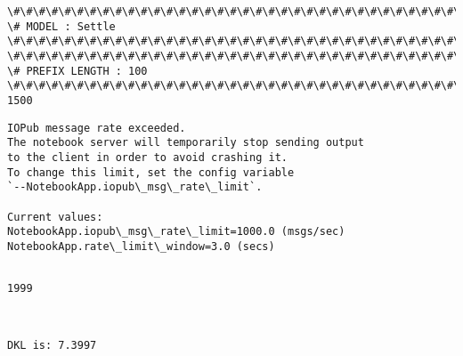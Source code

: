 \documentclass[11pt]{article}
\begin{document}
    \begin{Verbatim}[commandchars=\\\{\}]
\#\#\#\#\#\#\#\#\#\#\#\#\#\#\#\#\#\#\#\#\#\#\#\#\#\#\#\#\#\#\#\#\#\#\#\#\#\#\#\#\#\#\#\#\#\#\#\#\#\#\#\#\#\#\#\#\#\#\#\#\#\#\#\#\#\#\#\#\#\#\#\#\#\#\#\#
\# MODEL : Settle
\#\#\#\#\#\#\#\#\#\#\#\#\#\#\#\#\#\#\#\#\#\#\#\#\#\#\#\#\#\#\#\#\#\#\#\#\#\#\#\#\#\#\#\#\#\#\#\#\#\#\#\#\#\#\#\#\#\#\#\#\#\#\#\#\#\#\#\#\#\#\#\#\#\#\#\#
\#\#\#\#\#\#\#\#\#\#\#\#\#\#\#\#\#\#\#\#\#\#\#\#\#\#\#\#\#\#\#\#\#\#\#\#\#\#\#\#\#\#\#\#\#\#\#\#\#\#\#\#\#\#\#\#\#\#\#\#\#\#\#\#\#\#\#\#\#\#\#\#\#\#\#\#
\# PREFIX LENGTH : 100
\#\#\#\#\#\#\#\#\#\#\#\#\#\#\#\#\#\#\#\#\#\#\#\#\#\#\#\#\#\#\#\#\#\#\#\#\#\#\#\#\#\#\#\#\#\#\#\#\#\#\#\#\#\#\#\#\#\#\#\#\#\#\#\#\#\#\#\#\#\#\#\#\#\#\#\#
1500

    \end{Verbatim}

    \begin{Verbatim}[commandchars=\\\{\}]
IOPub message rate exceeded.
The notebook server will temporarily stop sending output
to the client in order to avoid crashing it.
To change this limit, set the config variable
`--NotebookApp.iopub\_msg\_rate\_limit`.

Current values:
NotebookApp.iopub\_msg\_rate\_limit=1000.0 (msgs/sec)
NotebookApp.rate\_limit\_window=3.0 (secs)


    \end{Verbatim}

    \begin{Verbatim}[commandchars=\\\{\}]
1999

    \end{Verbatim}

    \begin{center}
    \end{center}
    { \hspace*{\fill} \\}
    
    \begin{Verbatim}[commandchars=\\\{\}]
DKL is: 7.3997

    \end{Verbatim}


    
    
    
    
\end{document}
